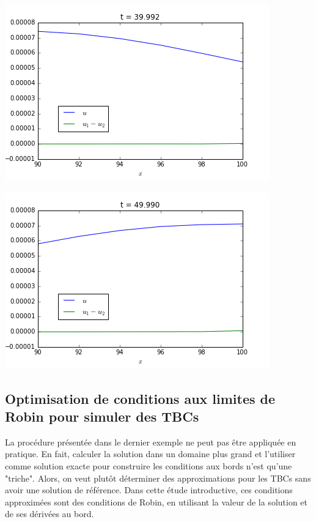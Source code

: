 \indent 

\begingroup
\noindent
	\begin{minipage}{.45\linewidth}
		\includegraphics[scale=.4]{figures/motivational2A.png}	
	\end{minipage}
	\hfill
	\begin{minipage}{.45\linewidth}
		\includegraphics[scale=.4]{figures/motivational2B.png}	
	\end{minipage}
\endgroup

\subsection{Optimisation de conditions aux limites de Robin pour simuler des TBCs}

\indent La procédure présentée dans le dernier exemple ne peut pas être appliquée en pratique. En fait, calculer la solution dans un domaine plus grand et l'utiliser comme solution exacte pour construire les conditions aux bords n'est qu'une "triche". Alors, on veut plutôt déterminer des approximations pour les TBCs sans avoir une solution de référence. Dans cette étude introductive, ces conditions approximées sont des conditions de Robin, en utilisant la valeur de la solution et de ses dérivées au bord.

